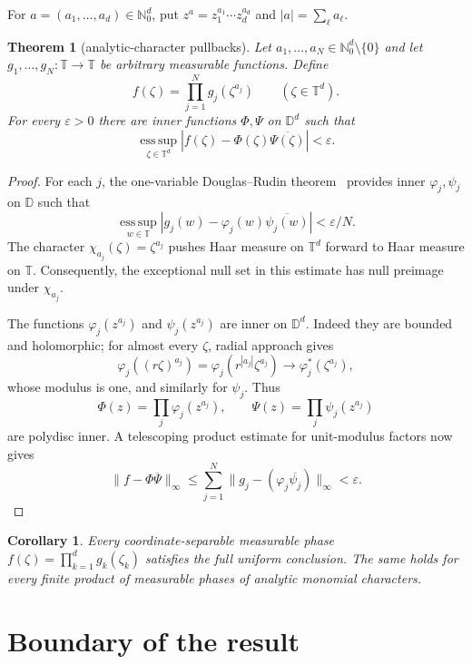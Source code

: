 \documentclass[11pt]{article}
\newtheorem{theorem}{Theorem}
\newtheorem{corollary}{Corollary}
\newcommand{\T}{\mathbb T}
\newcommand{\D}{\mathbb D}
\begin{document}
For $a=(a_1,\ldots,a_d)\in\mathbb N_0^d$, put
$z^a=z_1^{a_1}\cdots z_d^{a_d}$ and $|a|=\sum_\ell a_\ell$.

\begin{theorem}[analytic-character pullbacks]
\label{thm:pullback}
Let $a_1,\ldots,a_N\in\mathbb N_0^d\setminus\{0\}$ and let
$g_1,\ldots,g_N:\T\to\T$ be arbitrary measurable functions.  Define
\[
               f(\zeta)=\prod_{j=1}^N g_j(\zeta^{a_j})
               \qquad(\zeta\in\T^d).
\]
For every $\varepsilon>0$ there are inner functions $\Phi,\Psi$ on $\D^d$
such that
\[
        \operatorname*{ess\,sup}_{\zeta\in\T^d}
        |f(\zeta)-\Phi(\zeta)\overline{\Psi(\zeta)}|<\varepsilon.
\]
\end{theorem}

\begin{proof}
For each $j$, the one-variable Douglas--Rudin theorem~\cite{DouglasRudin}
provides inner $\varphi_j,\psi_j$ on $\D$ such that
\[
 \operatorname*{ess\,sup}_{w\in\T}
 |g_j(w)-\varphi_j(w)\overline{\psi_j(w)}|<\varepsilon/N.
\]
The character $\chi_{a_j}(\zeta)=\zeta^{a_j}$ pushes Haar measure on
$\T^d$ forward to Haar measure on $\T$.  Consequently, the exceptional null
set in this estimate has null preimage under $\chi_{a_j}$.

The functions $\varphi_j(z^{a_j})$ and $\psi_j(z^{a_j})$ are inner on
$\D^d$.  Indeed they are bounded and holomorphic; for almost every $\zeta$,
radial approach gives
\[
 \varphi_j((r\zeta)^{a_j})
 =\varphi_j(r^{|a_j|}\zeta^{a_j})
 \longrightarrow \varphi_j^*(\zeta^{a_j}),
\]
whose modulus is one, and similarly for $\psi_j$.
Thus
\[
   \Phi(z)=\prod_j\varphi_j(z^{a_j}),\qquad
   \Psi(z)=\prod_j\psi_j(z^{a_j})
\]
are polydisc inner.  A telescoping product estimate for unit-modulus factors
now gives
\[
 \|f-\Phi\overline\Psi\|_\infty
 \leq\sum_{j=1}^N
 \|g_j-(\varphi_j\overline{\psi_j})\|_\infty<\varepsilon.
\]
\end{proof}

\begin{corollary}
Every coordinate-separable measurable phase
$f(\zeta)=\prod_{k=1}^d g_k(\zeta_k)$ satisfies the full uniform conclusion.
The same holds for every finite product of measurable phases of analytic
monomial characters.
\end{corollary}

\section{Boundary of the result}
\end{document}
